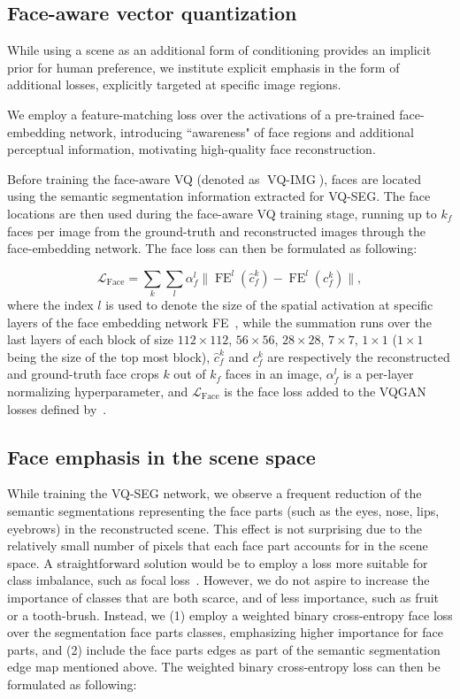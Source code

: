 \documentclass[final]{cvpr}
\begin{document}
\subsection{Face-aware vector quantization} 
While using a scene as an additional form of conditioning provides an implicit prior for human preference, we institute explicit emphasis in the form of additional losses, explicitly targeted at specific image regions. 

We employ a feature-matching loss over the activations of a pre-trained face-embedding network, introducing ``awareness" of face regions and additional perceptual information, motivating high-quality face reconstruction. 

Before training the face-aware VQ (denoted as $\operatorname{VQ-IMG}$), faces are located using the semantic segmentation information extracted for VQ-SEG. The face locations are then used during the face-aware VQ training stage, running up to $k_f$ faces per image from the ground-truth and reconstructed images through the face-embedding network. The face loss can then be formulated as following:

\begin{equation}
    \mathcal{L}_\text{Face} = \sum_k\sum_l\alpha_f^l \|\operatorname{FE}^l(\hat{c}_{f}^{k})-\operatorname{FE}^{l}(c_{f}^{k})\|,
    \label{eq:vggface}
\end{equation}
where the index $l$ is used to denote the size of the spatial activation at specific layers of the face embedding network FE~\cite{vggface2}, while the summation runs over the last layers of each block of size $112\times112$, $56\times56$, $28\times28$, $7\times7$, $1\times1$ ($1\times 1$ being the size of the top most block), $\hat{c}_{f}^{k}$ and $c_{f}^{k}$ are respectively the reconstructed and ground-truth face crops $k$ out of $k_f$ faces in an image, $\alpha_f^l$ is a per-layer normalizing hyperparameter, and $\mathcal{L}_\text{Face}$ is the face loss added to the VQGAN losses defined by~\cite{esser2021taming}.

\subsection{Face emphasis in the scene space}
While training the VQ-SEG network, we observe a frequent reduction of the semantic segmentations representing the face parts (such as the eyes, nose, lips, eyebrows) in the reconstructed scene. This effect is not surprising due to the relatively small number of pixels that each face part accounts for in the scene space. A straightforward solution would be to employ a loss more suitable for class imbalance, such as focal loss~\cite{lin2017focal}. However, we do not aspire to increase the importance of classes that are both scarce, and of less importance, such as fruit or a tooth-brush. 
Instead, we (1) employ a weighted binary cross-entropy face loss over the segmentation face parts classes, emphasizing higher importance for face parts, and (2) include the face parts edges as part of the semantic segmentation edge map mentioned above.
The weighted binary cross-entropy loss can then be formulated as following:
\end{document}
